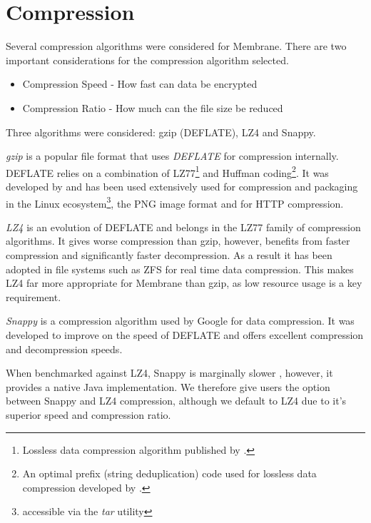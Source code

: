 \documentclass[11pt, a4paper, twocolumn, twoside]{report}
\begin{document}
\section{Compression} \label{sec:compression}

Several compression algorithms were considered for Membrane. There are two important considerations for the compression algorithm selected.

\begin{itemize}
 \item Compression Speed - How fast can data be encrypted
 \item Compression Ratio - How much can the file size be reduced
\end{itemize}

Three algorithms were considered: gzip (DEFLATE), LZ4 and Snappy.

\emph{gzip} is a popular file format that uses \emph{DEFLATE} for compression internally. DEFLATE relies on a combination of LZ77\footnote{Lossless data compression algorithm published by \cite{ziv1977universal}.} and Huffman coding\footnote{An optimal prefix (string deduplication) code used for lossless data compression developed by \cite{huffman1952method}.}. It was developed by \cite{deutsch1996deflate} and has been used extensively used for compression and packaging in the Linux ecosystem\footnote{accessible via the \emph{tar} utility}, the PNG image format and for HTTP compression.

\emph{LZ4} is an evolution of DEFLATE and belongs in the LZ77 family of compression algorithms. It gives worse compression than gzip, however, benefits from faster compression and significantly faster decompression. \citep{legesse2014performance} As a result it has been adopted in file systems such as ZFS for real time data compression. This makes LZ4 far more appropriate for Membrane than gzip, as low resource usage is a key requirement.

\emph{Snappy} is a compression algorithm used by Google for data compression. It was developed to improve on the speed of DEFLATE and offers excellent compression and decompression speeds. \citep{google2017snappy}

When benchmarked against LZ4, Snappy is marginally slower \citep{vorontsov2015compression}, however, it provides a native Java implementation. We therefore give users the option between Snappy and LZ4 compression, although we default to LZ4 due to it's superior speed and compression ratio. \citep{lz42017lz4}
\end{document}

